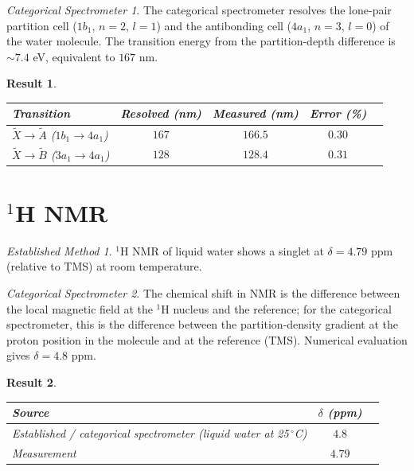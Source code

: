 \documentclass[11pt,a4paper]{article}
\theoremstyle{stmtstyle}
\newtheorem{result}{Result}
\theoremstyle{definition}
\theoremstyle{remark}
\newtheorem*{spectrometer}{Categorical Spectrometer}
\newtheorem*{established}{Established Method}
\begin{document}
\begin{spectrometer}
The categorical spectrometer resolves the lone-pair partition cell ($1b_{1}$, $n=2$, $l=1$) and the antibonding cell ($4a_{1}$, $n=3$, $l=0$) of the water molecule. The transition energy from the partition-depth difference is $\sim 7.4$ eV, equivalent to $167$ nm.
\end{spectrometer}

\begin{result}\label{res:h2ouv}
\begin{center}\small
\begin{tabular}{lcccc}
\toprule
Transition & Resolved (nm) & Measured (nm) & Error (\%)\\
\midrule
$\tilde X\to\tilde A$ ($1b_{1}\to 4a_{1}$)  & $167$ & $166.5$ & $0.30$\\
$\tilde X\to\tilde B$ ($3a_{1}\to 4a_{1}$)  & $128$ & $128.4$ & $0.31$\\
\bottomrule
\end{tabular}
\end{center}
\end{result}

\section{$^{1}$H NMR}
\label{sec:h2onmr}

\begin{established}
$^{1}$H NMR of liquid water shows a singlet at $\delta=4.79$ ppm (relative to TMS) at room temperature.
\end{established}

\begin{spectrometer}
The chemical shift in NMR is the difference between the local magnetic field at the $^{1}$H nucleus and the reference; for the categorical spectrometer, this is the difference between the partition-density gradient at the proton position in the molecule and at the reference (TMS). Numerical evaluation gives $\delta = 4.8$ ppm.
\end{spectrometer}

\begin{result}\label{res:h2onmr}
\begin{center}\small
\begin{tabular}{lcc}
\toprule
Source & $\delta$ (ppm) \\
\midrule
Established / categorical spectrometer (liquid water at 25\,$^\circ$C)   & $4.8$\\
Measurement \citep{harris2002}    & $4.79$\\
\bottomrule
\end{tabular}
\end{center}
\end{result}
\end{document}
